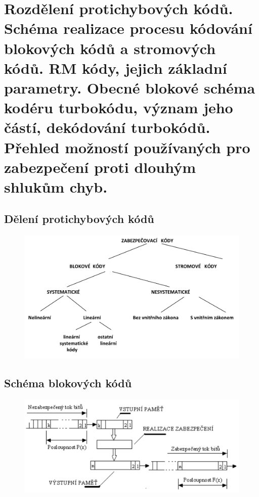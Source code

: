 \clearpage
\section{Rozdělení protichybových kódů. Schéma realizace procesu kódování blokových kódů a stromových kódů. RM kódy, jejich základní parametry. Obecné blokové schéma kodéru turbokódu, význam jeho částí, dekódování turbokódů. Přehled možností používaných pro zabezpečení proti dlouhým shlukům chyb.}

\subsection{Dělení protichybových kódů}

\begin{figure}[h]
    \centering
    \includegraphics[width=\textwidth]{images/040.png}
\end{figure}

\subsection{Schéma blokových kódů}

\begin{figure}[h]
    \centering
    \includegraphics[width=\textwidth]{images/041.png}
\end{figure}

